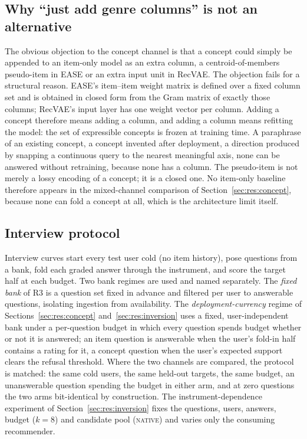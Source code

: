 \documentclass[acmsmall,review,anonymous]{acmart}
\begin{document}
\subsection{Why ``just add genre columns'' is not an alternative}\label{sec:setup:columns}
The obvious objection to the concept channel is that a concept could simply be appended to an item-only model as an extra column, a centroid-of-members pseudo-item in EASE or an extra input unit in RecVAE. The objection fails for a structural reason. EASE's item--item weight matrix is defined over a fixed column set and is obtained in closed form from the Gram matrix of exactly those columns; RecVAE's input layer has one weight vector per column. Adding a concept therefore means adding a column, and adding a column means refitting the model: the set of expressible concepts is frozen at training time. A paraphrase of an existing concept, a concept invented after deployment, a direction produced by snapping a continuous query to the nearest meaningful axis, none can be answered without retraining, because none has a column. The pseudo-item is not merely a lossy encoding of a concept; it is a closed one. No item-only baseline therefore appears in the mixed-channel comparison of Section~\ref{sec:res:concept}, because none can fold a concept at all, which is the architecture limit itself.

\subsection{Interview protocol}
Interview curves start every test user cold (no item history), pose questions from a bank, fold each graded answer through the instrument, and score the target half at each budget. Two bank regimes are used and named separately. The \emph{fixed bank} of R3 is a question set fixed in advance and filtered per user to answerable questions, isolating ingestion from availability. The \emph{deployment-currency} regime of Sections~\ref{sec:res:concept} and~\ref{sec:res:inversion} uses a fixed, user-independent bank under a per-question budget in which every question spends budget whether or not it is answered; an item question is answerable when the user's fold-in half contains a rating for it, a concept question when the user's expected support clears the refusal threshold. Where the two channels are compared, the protocol is matched: the same cold users, the same held-out targets, the same budget, an unanswerable question spending the budget in either arm, and at zero questions the two arms bit-identical by construction. The instrument-dependence experiment of Section~\ref{sec:res:inversion} fixes the questions, users, answers, budget ($k{=}8$) and candidate pool (\textsc{native}) and varies only the consuming recommender.
\end{document}

